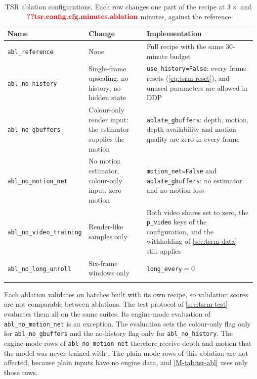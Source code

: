 \begin{table}[!htbp]
\caption{TSR ablation configurations. Each row changes one part of the  recipe at $3\times$ and $\Res{tsr.config.cfg.minutes.ablation}$ minutes, against the reference}\label{tab:tsrm-abl-config}
{\scriptsize\raggedright\setlength{\tabcolsep}{3pt}
\begin{tabular*}{\textwidth}{@{\extracolsep\fill}p{}p{}p{}}
\toprule
Name & Change & Implementation \\
\midrule
\texttt{abl\_reference} & None & Full recipe with the same $30$-minute budget \\
\texttt{abl\_no\_history} & Single-frame upscaling: no history, no hidden state & \texttt{use\_history=False}: every frame resets (\cref{eq:tsrm-reset}), and unused parameters are allowed in DDP \\
\texttt{abl\_no\_gbuffers} & Colour-only render input: the estimator supplies the motion & \texttt{ablate\_gbuffers}: depth, motion, depth availability and motion quality are zero in every frame \\
\texttt{abl\_no\_motion\_net} & No motion estimator, colour-only input, zero motion & \texttt{motion\_net=False} and \texttt{ablate\_gbuffers}: no estimator and no motion loss \\
\texttt{abl\_no\_video\_training} & Render-like samples only & Both video shares set to zero, the \texttt{p\_video} keys of the configuration, and the withholding of \cref{sec:tsrm-data} still applies \\
\texttt{abl\_no\_long\_unroll} & Six-frame windows only & \texttt{long\_every}$=0$ \\
\botrule
\end{tabular*}}
\end{table}

Each ablation validates on batches built with its own recipe, so validation scores are not comparable between ablations. The test protocol of \cref{sec:tsrm-test} evaluates them all on the same suites. Its engine-mode evaluation of \texttt{abl\_no\_motion\_net} is an exception. The evaluation sets the colour-only flag only for \texttt{abl\_no\_gbuffers} and the no-history flag only for \texttt{abl\_no\_history}. The engine-mode rows of \texttt{abl\_no\_motion\_net} therefore receive depth and motion that the model was never trained with \UnderRevision. The plain-mode rows of this ablation are not affected, because plain inputs have no engine data, and \cref{M-tab:tsr-abl} uses only those rows.

